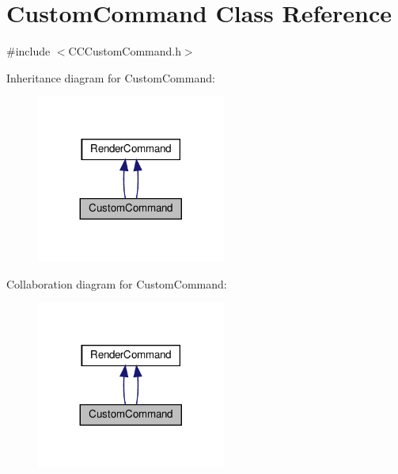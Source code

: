 \hypertarget{classCustomCommand}{}\section{Custom\+Command Class Reference}
\label{classCustomCommand}


{\ttfamily \#include $<$C\+C\+Custom\+Command.\+h$>$}



Inheritance diagram for Custom\+Command\+:
\nopagebreak
\begin{figure}[H]
\begin{center}
\leavevmode
\includegraphics[width=176pt]{classCustomCommand__inherit__graph}
\end{center}
\end{figure}


Collaboration diagram for Custom\+Command\+:
\nopagebreak
\begin{figure}[H]
\begin{center}
\leavevmode
\includegraphics[width=176pt]{classCustomCommand__coll__graph}
\end{center}
\end{figure}
